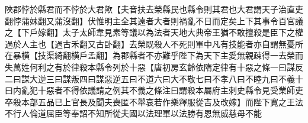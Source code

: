 陜郡悖於縣君而不悖於大君歟【夫音扶去榮縣民也縣令則其君也大君謂天子治直吏翻悖蒲妹翻又蒲沒翻】伏惟明主全其遠者大者則禍亂不日而定矣上下其事令百官議之【下戶嫁翻】太子太師韋見素等議以為法者天地大典帝王猶不敢擅殺是臣下之權過於人主也【過古禾翻又古卧翻】去榮既殺人不死則軍中凡有技能者亦自謂無憂所在暴横【技渠綺翻横戶孟翻】為郡縣者不亦難乎陛下為天下主愛無親疎得一去榮而失萬姓何利之有於律殺本縣令列於十惡【唐初房玄齡依隋定律有十惡之條一曰謀反二曰謀大逆三曰謀叛四曰謀惡逆五曰不道六曰大不敬七曰不孝八曰不睦九曰不義十曰内亂犯十惡者不得依議請之例其不義之條注曰謂殺本屬府主刺史縣令見受業師吏卒殺本部五品已上官長及聞夫喪匿不舉哀若作樂釋服從吉及改嫁】而陛下寛之王法不行人倫道屈臣等奉詔不知所從夫國以法理軍以法勝有恩無威慈母不能